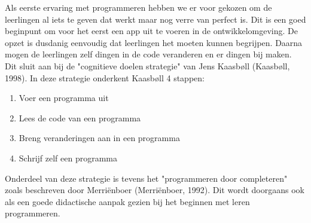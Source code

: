 \documentclass{BYUTextbook}
\begin{document}
Als eerste ervaring met programmeren hebben we er voor gekozen om de leerlingen al iets te geven dat werkt maar nog verre van perfect is. Dit is een goed beginpunt om voor het eerst een app uit te voeren in de ontwikkelomgeving. De opzet is dusdanig eenvoudig dat leerlingen het moeten kunnen begrijpen. Daarna mogen de leerlingen zelf dingen in de code veranderen en er dingen bij maken. Dit sluit aan bij de "cognitieve doelen strategie" van Jens Kaasb\o ll (Kaasb\o ll, 1998). In deze strategie onderkent Kaasb\o ll 4 stappen:
\begin{enumerate}
  \item Voer een programma uit
  \item Lees de code van een programma
  \item Breng veranderingen aan in een programma
  \item Schrijf zelf een programma
\end{enumerate}

Onderdeel van deze strategie is tevens het "programmeren door completeren" zoals beschreven door Merri\"{e}nboer (Merri\"{e}nboer, 1992). Dit wordt doorgaans ook als een goede didactische aanpak gezien bij het beginnen met leren programmeren.
\end{document}

